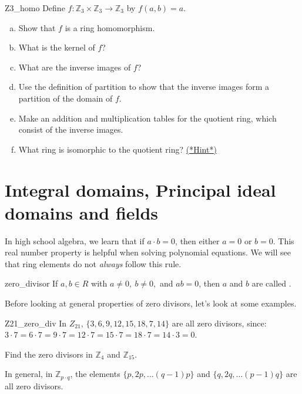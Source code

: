\begin{exercise}{Z3_homo}
Define $f:{\mathbb Z}_3\times {\mathbb Z}_3\rightarrow {\mathbb Z}_3$ by $f(a,b)=a$.
\begin{enumerate}[(a)]
\item Show that $f$ is a ring homomorphism.
\item What is the kernel of $f$?
\item What are the inverse images of $f$?
\item Use the definition of partition to show that the inverse images form a partition of the domain of $f$.
\item Make an addition and multiplication tables for the quotient ring, which consist of the inverse images.
\item What ring is isomorphic to the quotient ring?  \hyperref[ringsHints]{(*Hint*)} 
\end{enumerate}
\end{exercise}


\section{Integral domains, Principal ideal domains and fields}
\label{sec:Rings:IntegralDomainsPrincipalIdealDomains}

In high school algebra, we learn that if $a\cdot b=0$, then either $a=0$ or $b=0$.  This real number property is helpful when solving polynomial equations.  We will see that ring elements do not \emph{always} follow this rule.

\begin{defn}{zero_divisor}
If $a,b\in R$ with $a\neq 0,~b\neq 0,$ and $ab=0$, then $a$ and $b$ are called .
\end{defn}

Before looking at general properties of zero divisors, let's look at some examples.

\begin{example}{Z21_zero_div}
In $Z_{21}$, $\{3,6,9,12,15,18,7,14\}$ are all zero divisors, since:
$3\cdot 7=6\cdot 7=9\cdot 7=12\cdot 7=15\cdot 7=18\cdot 7=14\cdot 3=0$.
\end{example}

\begin{exercise}{}
Find the zero divisors in ${\mathbb Z}_4$ and ${\mathbb Z}_{15}$.
\end{exercise}

In general, in ${\mathbb Z}_{p\cdot q}$, the elements $\{p,2p,\dots(q-1)p\}$ and $\{q,2q,\dots (p-1)q\}$ are all zero divisors.  

